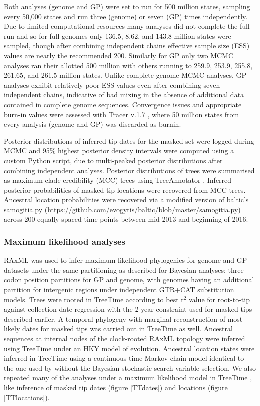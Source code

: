 \documentclass[11pt,oneside,letterpaper]{article}
\begin{document}
Both analyses (genome and GP) were set to run for 500 million states, sampling  every 50,000 states and run three (genome) or seven (GP) times independently.
Due to limited computational resources many analyses did not complete the full run and so for full genomes only 136.5, 8.62, and 143.8 million states were sampled, though after combining independent chains effective sample size (ESS) values are nearly the recommended 200.
Similarly for GP only two MCMC analyses ran their allotted 500 million with others running to 259.9, 253.9, 255.8, 261.65, and 261.5 million states.
Unlike complete genome MCMC analyses, GP analyses exhibit relatively poor ESS values even after combining seven independent chains, indicative of bad mixing in the absence of additional data contained in complete genome sequences.
Convergence issues and appropriate burn-in values were assessed with Tracer v.1.7 \citep{rambaut_posterior_2018}, where 50 million states from every analysis (genome and GP) was discarded as burnin.

Posterior distributions of inferred tip dates for the masked set were logged during MCMC and 95\% highest posterior density intervals were computed using a custom Python script, due to multi-peaked posterior distributions after combining independent analyses.
Posterior distributions of trees were summarised as maximum clade credibility (MCC) trees using TreeAnnotator \citep{suchard_bayesian_2018}.
Inferred posterior probabilities of masked tip locations were recovered from MCC trees.
Ancestral location probabilities were recovered via a modified version of baltic's samogitia.py (\url{https://github.com/evogytis/baltic/blob/master/samogitia.py}) across 200 equally spaced time points between mid-2013 and beginning of 2016.

\subsubsection*{Maximum likelihood analyses}
RAxML \citep{stamatakis_raxml_2014} was used to infer maximum likelihood phylogenies for genome and GP datasets under the same partitioning as described for Bayesian analyses: three codon position partitions for GP and genome, with genomes having an additional partition for intergenic regions under independent GTR+CAT substitution models.
Trees were rooted in TreeTime according to best r$^{2}$ value for root-to-tip against collection date regression with the 2 year constraint used for masked tips described earlier.
A temporal phylogeny with marginal reconstruction of most likely dates for masked tips was carried out in TreeTime \citep{sagulenko_treetime:_2018} as well.
Ancestral sequences at internal nodes of the clock-rooted RAxML topology were inferred using TreeTime under an HKY model \citep{hky_1985} of evolution.
Ancestral location states were inferred in TreeTime using a continuous time Markov chain model identical to the one used by \cite{lemey_bayesian_2009} without the Bayesian stochastic search variable selection.
We also repeated many of the analyses under a maximum likelihood model in TreeTime \citep{sagulenko_treetime:_2018}, like inference of masked tip dates (figure \ref{TTdates}) and locations (figure \ref{TTlocations}).
\end{document}
